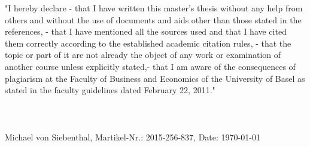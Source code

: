
  "I hereby declare - that I have written this master's thesis without any help 
  from others and without the use of documents and aids other than those stated 
  in the references, - that I have mentioned all the sources used and that I 
  have cited them correctly according to the established academic citation rules, 
  - that the topic or part of it are not already the object of any work or 
  examination of another course unless explicitly stated,- that I am aware of 
  the consequences of plagiarism at the Faculty of Business and Economics 
  of the University of Basel as stated in the faculty guidelines dated February 
  22, 2011."\\\\\\\\

  \noindent Michael von Siebenthal, Martikel-Nr.: 2015-256-837, Date: \today
